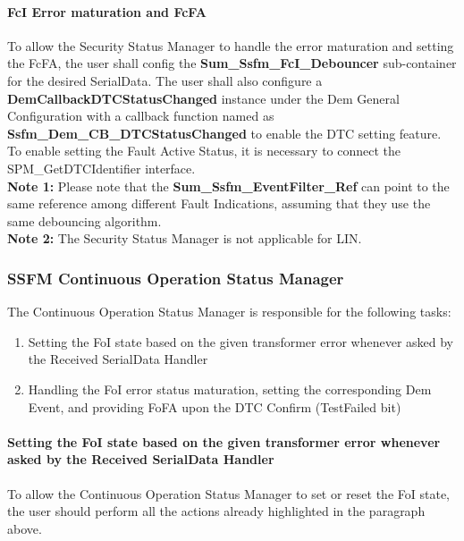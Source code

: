 \paragraph{FcI Error maturation and FcFA}
To allow the Security Status Manager to handle the error maturation and setting the FcFA, the user shall config the \textbf{Sum\_Ssfm\_FcI\_Debouncer} sub-container for the desired SerialData.
The user shall also configure a \textbf{DemCallbackDTCStatusChanged} instance under the Dem General Configuration 
with a callback function named as \textbf{Ssfm\_Dem\_CB\_DTCStatusChanged} to enable the DTC setting feature.
To enable setting the Fault Active Status, it is necessary to connect the SPM\_GetDTCIdentifier interface.
\\\textbf{Note 1:} Please note that the \textbf{Sum\_Ssfm\_EventFilter\_Ref} can point to the same reference among different Fault Indications, assuming that they use the same debouncing algorithm. 
\\\textbf{Note 2:} The Security Status Manager is not applicable for LIN.

\subsubsection{SSFM Continuous Operation Status Manager}
\label{subsec:continuousoperationstatusmanager}

The Continuous Operation Status Manager is responsible for the following tasks:

\begin{enumerate}
\item Setting the FoI state based on the given transformer error whenever asked by the Received SerialData Handler
\item Handling the FoI error status maturation, setting the corresponding Dem Event, and providing FoFA upon the DTC Confirm (TestFailed bit)
\end{enumerate}

\paragraph{Setting the FoI state based on the given transformer error whenever asked by the Received SerialData Handler}
To allow the Continuous Operation Status Manager to set or reset the FoI state, the user should perform all the actions already highlighted in the paragraph above.

